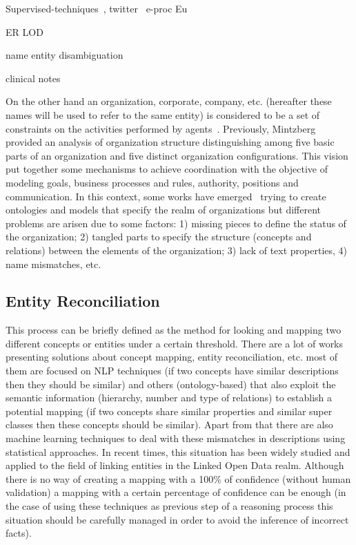 \documentclass{llncs}
\begin{document}
Supervised-techniques~\cite{Bohn:2006:PHD}, twitter~\cite{Li:2012:TNE:2348283.2348380,Gimpel:2011:PTT:2002736.2002747}
e-proc Eu

ER LOD~\cite{conf/www/MaaliCP11,Serimi}

name entity disambiguation

clinical notes~\cite{Wang:2009:ARN:1667884.1667888}

On the other hand an organization, corporate, company, etc. (hereafter these names 
will be used to refer to the same entity) is considered to be a set 
of constraints on the activities performed by agents~\cite{Weber1978}. Previously, 
Mintzberg provided an analysis of organization structure distinguishing among 
five basic parts of an organization and five distinct organization configurations. This vision put 
together some mechanisms to achieve coordination with the objective of modeling goals, 
business processes and rules, authority, positions and communication. In this context, some works 
have emerged~\cite{Fox95anorganisation} trying to create ontologies and models that specify the realm of 
organizations but different problems are arisen due to some factors: 1) missing pieces to define the status of the organization; 
2) tangled parts to specify the structure (concepts and relations) between the elements of the organization; 
3) lack of text properties, 4) name mismatches, etc. 



\subsection{Entity Reconciliation}
This process can be briefly defined as the method for looking and mapping two different concepts or entities under a certain threshold. 
There are a lot of  works presenting solutions about concept mapping, entity reconciliation, etc. 
most of them are focused on NLP techniques (if two concepts have similar descriptions 
then they should be similar) and others (ontology-based) that also exploit 
the semantic information (hierarchy, number and type of relations) to establish a 
potential mapping (if two concepts share similar properties and similar super classes then these 
concepts should be similar). Apart from that there are also machine learning techniques to deal with these 
mismatches in descriptions using statistical approaches. In recent times, this situation has been widely studied and applied to the field 
of linking entities in the Linked Open Data realm. Although there is no way of creating a mapping with a 100\% of confidence 
(without human validation) a  mapping with a certain percentage of confidence can be enough 
(in the case of using these techniques as previous step of a reasoning process this situation should be 
carefully managed in order to avoid the inference of incorrect facts). 
\end{document}
